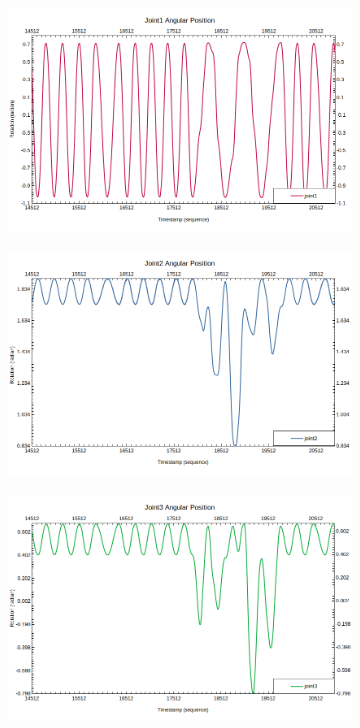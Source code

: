 \begin{figure}
  \centering
  \captionsetup{justification=centering}
  \begin{subfigure}[b]{0.4\linewidth}
    \label{subfig:top_view}
    \includegraphics[width=\linewidth]{joint1u.png}
     \caption{}
  \end{subfigure}
  \begin{subfigure}[b]{0.4\linewidth}
    \includegraphics[width=\linewidth]{joint2u.png}
    \caption{}
  \end{subfigure}
  \begin{subfigure}[b]{0.4\linewidth}
    \includegraphics[width=\linewidth]{joint3u.png}

\end{subfigure}
\end{figure}
